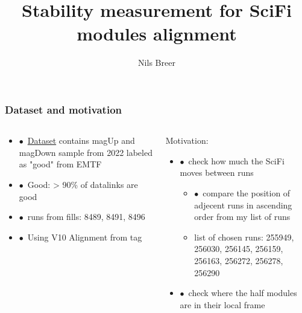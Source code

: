 \documentclass[aspectratio=1610, 12pt]{beamer}
\title{Stability measurement for SciFi modules alignment}
\author[N.Breer]{Nils Breer}
\institute{TU Dortmund, AG Albrecht}
\begin{document}
\maketitle

\begin{frame}\frametitle{Dataset and motivation}
  \begin{columns}
    \begin{column}[c]{0.48\textwidth}
      \begin{itemize}
        \setlength\itemsep{0em}
        \item $\bullet$\, \href{https://twiki.cern.ch/twiki/bin/viewauth/LHCbInternal/CommissioningData2022}{Dataset} contains magUp and magDown sample from 2022 labeled as "good" from EMTF 
        \item $\bullet$\, Good: > 90\% of datalinks are good
        \item $\bullet$\, runs from fills: 8489, 8491, 8496
        \item $\bullet$\, Using V10 Alignment from tag
      \end{itemize}
    \end{column}
    \begin{column}[c]{0.48\textwidth}
      Motivation:
      \begin{itemize}
        \setlength\itemsep{0em}
        \item $\bullet$\, check how much the SciFi moves between runs
        \begin{itemize}
          \item $\bullet$\, compare the position of adjecent runs in ascending order from my list of runs
          \item list of chosen runs: 255949, 256030, 256145, 256159, 256163, 256272, 256278, 256290
        \end{itemize}
        \item $\bullet$\, check where the half modules are in their local frame
      \end{itemize}
    \end{column}
  \end{columns}
\end{frame}
\end{document}
